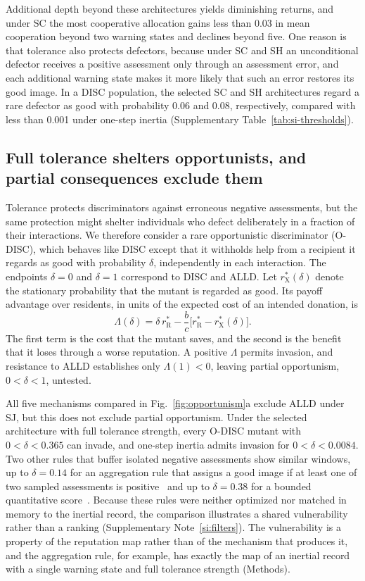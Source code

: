 \documentclass[10pt]{wlscirep}
\newcommand{\rR}{r_{\mathrm{R}}^{*}}
\newcommand{\rX}{r_{\mathrm{X}}^{*}}
\theoremstyle{plain}
\theoremstyle{remark}
\begin{document}
Additional depth beyond these architectures yields diminishing returns, and under SC the most cooperative allocation gains less than 0.03 in mean cooperation beyond two warning states and declines beyond five. One reason is that tolerance also protects defectors, because under SC and SH an unconditional defector receives a positive assessment only through an assessment error, and each additional warning state makes it more likely that such an error restores its good image. In a DISC population, the selected SC and SH architectures regard a rare defector as good with probability 0.06 and 0.08, respectively, compared with less than 0.001 under one-step inertia (Supplementary Table~\ref{tab:si-thresholds}).

\subsection*{Full tolerance shelters opportunists, and partial consequences exclude them}

Tolerance protects discriminators against erroneous negative assessments, but the same protection might shelter individuals who defect deliberately in a fraction of their interactions. We therefore consider a rare opportunistic discriminator (O-DISC), which behaves like DISC except that it withholds help from a recipient it regards as good with probability $\delta$, independently in each interaction. The endpoints $\delta=0$ and $\delta=1$ correspond to DISC and ALLD. Let $\rX(\delta)$ denote the stationary probability that the mutant is regarded as good. Its payoff advantage over residents, in units of the expected cost of an intended donation, is
\begin{equation}
\Lambda(\delta)=\delta\,\rR-\frac{b}{c}\bigl[\rR-\rX(\delta)\bigr].
\label{eq:lambda}
\end{equation}
The first term is the cost that the mutant saves, and the second is the benefit that it loses through a worse reputation. A positive $\Lambda$ permits invasion, and resistance to ALLD establishes only $\Lambda(1)<0$, leaving partial opportunism, $0<\delta<1$, untested.

All five mechanisms compared in Fig.~\ref{fig:opportunism}a exclude ALLD under SJ, but this does not exclude partial opportunism. Under the selected architecture with full tolerance strength, every O-DISC mutant with $0<\delta<0.365$ can invade, and one-step inertia admits invasion for $0<\delta<0.0084$. Two other rules that buffer isolated negative assessments show similar windows, up to $\delta=0.14$ for an aggregation rule that assigns a good image if at least one of two sampled assessments is positive~\cite{michelmata2024} and up to $\delta=0.38$ for a bounded quantitative score~\cite{schmid2023}. Because these rules were neither optimized nor matched in memory to the inertial record, the comparison illustrates a shared vulnerability rather than a ranking (Supplementary Note~\ref{si:filters}). The vulnerability is a property of the reputation map rather than of the mechanism that produces it, and the aggregation rule, for example, has exactly the map of an inertial record with a single warning state and full tolerance strength (Methods).
\end{document}
